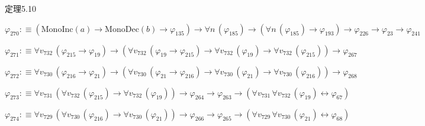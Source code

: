 \begin{fullproof}{定理5.10}
\begin{abbrevlist}
\item $\varphi_{270} :\equiv (\mathrm{MonoInc}(a) \to \mathrm{MonoDec}(b) \to \varphi_{135}) \to \forall n\,(\varphi_{185}) \to (\forall n\,(\varphi_{185}) \to \varphi_{193}) \to \varphi_{226} \to \varphi_{23} \to \varphi_{241}$
\item $\varphi_{271} :\equiv \forall v_{732}\,(\varphi_{215} \to \varphi_{19}) \to (\forall v_{732}\,(\varphi_{19} \to \varphi_{215}) \to \forall v_{732}\,(\varphi_{19}) \to \forall v_{732}\,(\varphi_{215})) \to \varphi_{267}$
\item $\varphi_{272} :\equiv \forall v_{730}\,(\varphi_{216} \to \varphi_{21}) \to (\forall v_{730}\,(\varphi_{21} \to \varphi_{216}) \to \forall v_{730}\,(\varphi_{21}) \to \forall v_{730}\,(\varphi_{216})) \to \varphi_{268}$
\item $\varphi_{273} :\equiv \forall v_{731}\,(\forall v_{732}\,(\varphi_{215}) \to \forall v_{732}\,(\varphi_{19})) \to \varphi_{264} \to \varphi_{263} \to (\forall v_{731}\,\forall v_{732}\,(\varphi_{19}) \leftrightarrow \varphi_{67})$
\item $\varphi_{274} :\equiv \forall v_{729}\,(\forall v_{730}\,(\varphi_{216}) \to \forall v_{730}\,(\varphi_{21})) \to \varphi_{266} \to \varphi_{265} \to (\forall v_{729}\,\forall v_{730}\,(\varphi_{21}) \leftrightarrow \varphi_{68})$
\end{abbrevlist}
\end{fullproof}
